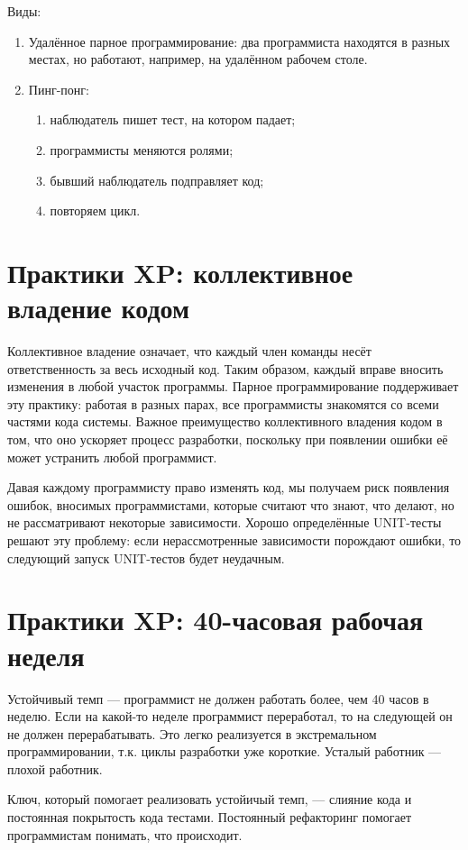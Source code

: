 \documentclass{article}
\let\stdsection\section
\renewcommand\section{\newpage\stdsection}
\begin{document}
    Виды:
    \begin{enumerate}
        \item Удалённое парное программирование: два программиста находятся в разных местах, но работают, например, на удалённом рабочем столе.
        \item Пинг-понг:
        \begin{enumerate}
            \item наблюдатель пишет тест, на котором падает;
            \item программисты меняются ролями;
            \item бывший наблюдатель подправляет код;
            \item повторяем цикл.
        \end{enumerate}
    \end{enumerate}

\section{Практики XP: коллективное владение кодом}
    Коллективное владение означает, что каждый член команды несёт ответственность за весь исходный код. Таким образом, каждый вправе вносить изменения в любой участок программы. Парное программирование поддерживает эту практику: работая в разных парах, все программисты знакомятся со всеми частями кода системы. Важное преимущество коллективного владения кодом в том, что оно ускоряет процесс разработки, поскольку при появлении ошибки её может устранить любой программист.

    Давая каждому программисту право изменять код, мы получаем риск появления ошибок, вносимых программистами, которые считают что знают, что делают, но не рассматривают некоторые зависимости. Хорошо определённые UNIT-тесты решают эту проблему: если нерассмотренные зависимости порождают ошибки, то следующий запуск UNIT-тестов будет неудачным.

\section{Практики XP: 40-часовая рабочая неделя}
    Устойчивый темп — программист не должен работать более, чем 40 часов в неделю. Если на какой-то неделе программист переработал, то на следующей он не должен перерабатывать. Это легко реализуется в экстремальном программировании, т.к. циклы разработки уже короткие. Усталый работник — плохой работник.

    Ключ, который помогает реализовать устойичый темп, — слияние кода и постоянная покрытость кода тестами. Постоянный рефакторинг помогает программистам понимать, что происходит.
\end{document}
